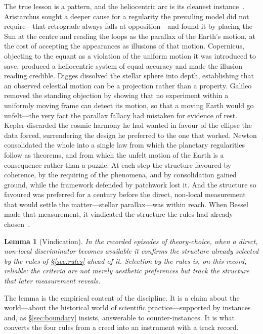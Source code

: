 \documentclass[11pt,a4paper]{article}
\newtheorem{lemma}{Lemma}
\begin{document}
The true lesson is a pattern, and the heliocentric arc is its cleanest instance~\cite{JanzenShadowReading}. Aristarchus sought a deeper cause for a regularity the prevailing model did not require---that retrograde always falls at opposition---and found it by placing the Sun at the centre and reading the loops as the parallax of the Earth's motion, at the cost of accepting the appearances as illusions of that motion. Copernicus, objecting to the equant as a violation of the uniform motion it was introduced to save, produced a heliocentric system of equal accuracy and made the illusion reading credible. Digges dissolved the stellar sphere into depth, establishing that an observed celestial motion can be a projection rather than a property. Galileo removed the standing objection by showing that no experiment within a uniformly moving frame can detect its motion, so that a moving Earth would go unfelt---the very fact the parallax fallacy had mistaken for evidence of rest. Kepler discarded the cosmic harmony he had wanted in favour of the ellipse the data forced, surrendering the design he preferred to the one that worked. Newton consolidated the whole into a single law from which the planetary regularities follow as theorems, and from which the unfelt motion of the Earth is a consequence rather than a puzzle. At each step the structure favoured by coherence, by the requiring of the phenomena, and by consolidation gained ground, while the framework defended by patchwork lost it. And the structure so favoured was preferred for a century before the direct, non-local measurement that would settle the matter---stellar parallax---was within reach. When Bessel made that measurement, it vindicated the structure the rules had already chosen~\cite{Bessel1838}.

\begin{lemma}[Vindication]\label{lem:vindication}
In the recorded episodes of theory-choice, when a direct, non-local discriminator becomes available it confirms the structure already selected by the rules of \S\ref{sec:rules} ahead of it. Selection by the rules is, on this record, reliable: the criteria are not merely aesthetic preferences but track the structure that later measurement reveals.
\end{lemma}

\noindent The lemma is the empirical content of the discipline. It is a claim about the world---about the historical world of scientific practice---supported by instances and, as \S\ref{sec:boundary} insists, answerable to counter-instances. It is what converts the four rules from a creed into an instrument with a track record.
\end{document}
